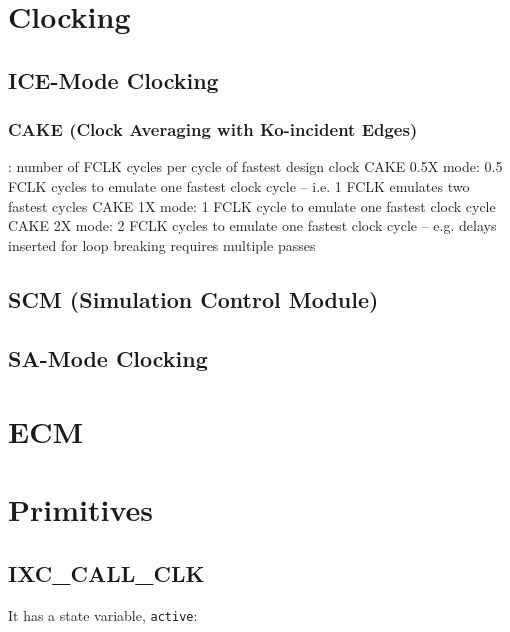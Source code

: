 \documentclass{note}
\begin{document}
\section{Clocking}
\subsection{ICE-Mode Clocking}
\subsubsection{CAKE (Clock Averaging with Ko-incident Edges)}
\bit
\w {}: number of FCLK cycles per cycle of fastest
    design clock
    \bit
    \w CAKE 0.5X mode: 0.5 FCLK cycles to emulate one fastest clock cycle --
    i.e. 1 FCLK emulates two fastest cycles
      \bit
      \w 
      \eit
    \w CAKE 1X mode: 1 FCLK cycle to emulate one fastest clock cycle
      \bit
      \w 
      \eit
    \w CAKE 2X mode: 2 FCLK cycles to emulate one fastest clock cycle --
        e.g. delays inserted for loop breaking requires multiple passes
      \bit
      \w 
      \eit
    \eit
\eit
\subsection{SCM (Simulation Control Module)}
\subsection{SA-Mode Clocking}


\section{ECM}


\section{Primitives}
\subsection{IXC\_CALL\_CLK}
\bit
\w It has a state variable, \verb+active+:
\eit
\end{document}
